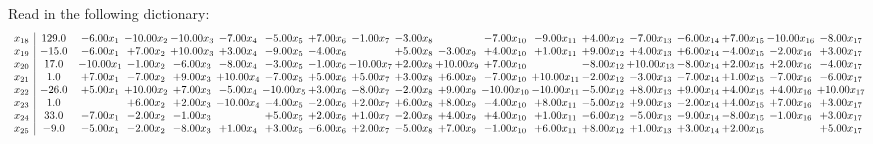\documentclass[9pt]{article}
\begin{document}
Read in the following dictionary:
\[\begin{array}{c| c c@{\hskip 2pt} c@{\hskip 2pt} c@{\hskip 2pt} c@{\hskip 2pt} c@{\hskip 2pt} c@{\hskip 2pt} c@{\hskip 2pt} c@{\hskip 2pt} c@{\hskip 2pt} c@{\hskip 2pt} c@{\hskip 2pt} c@{\hskip 2pt} c@{\hskip 2pt} c@{\hskip 2pt} c@{\hskip 2pt} c@{\hskip 2pt} c@{\hskip 2pt} }
 x_{18}   &  129.0 & -6.00 x_{1} & -10.00 x_{2} & -10.00 x_{3} & -7.00 x_{4} & -5.00 x_{5} & +  7.00 x_{6} & -1.00 x_{7} & -3.00 x_{8} &   & -7.00 x_{10} & -9.00 x_{11} & +  4.00 x_{12} & -7.00 x_{13} & -6.00 x_{14} & +  7.00 x_{15} & -10.00 x_{16} & -8.00 x_{17}\\
 x_{19}   &  -15.0 & -6.00 x_{1} & +  7.00 x_{2} & + 10.00 x_{3} & +  3.00 x_{4} & -9.00 x_{5} & -4.00 x_{6} &   & +  5.00 x_{8} & -3.00 x_{9} & +  4.00 x_{10} & +  1.00 x_{11} & +  9.00 x_{12} & +  4.00 x_{13} & +  6.00 x_{14} & -4.00 x_{15} & -2.00 x_{16} & +  3.00 x_{17}\\
 x_{20}   &  17.0 & -10.00 x_{1} & -1.00 x_{2} & -6.00 x_{3} & -8.00 x_{4} & -3.00 x_{5} & -1.00 x_{6} & -10.00 x_{7} & +  2.00 x_{8} & + 10.00 x_{9} & +  7.00 x_{10} &   & -8.00 x_{12} & + 10.00 x_{13} & -8.00 x_{14} & +  2.00 x_{15} & +  2.00 x_{16} & -4.00 x_{17}\\
 x_{21}   &  1.0 & +  7.00 x_{1} & -7.00 x_{2} & +  9.00 x_{3} & + 10.00 x_{4} & -7.00 x_{5} & +  5.00 x_{6} & +  5.00 x_{7} & +  3.00 x_{8} & +  6.00 x_{9} & -7.00 x_{10} & + 10.00 x_{11} & -2.00 x_{12} & -3.00 x_{13} & -7.00 x_{14} & +  1.00 x_{15} & -7.00 x_{16} & -6.00 x_{17}\\
 x_{22}   &  -26.0 & +  5.00 x_{1} & + 10.00 x_{2} & +  7.00 x_{3} & -5.00 x_{4} & -10.00 x_{5} & +  3.00 x_{6} & -8.00 x_{7} & -2.00 x_{8} & +  9.00 x_{9} & -10.00 x_{10} & -10.00 x_{11} & -5.00 x_{12} & +  8.00 x_{13} & +  9.00 x_{14} & +  4.00 x_{15} & +  4.00 x_{16} & + 10.00 x_{17}\\
 x_{23}   &  1.0  &   & +  6.00 x_{2} & +  2.00 x_{3} & -10.00 x_{4} & -4.00 x_{5} & -2.00 x_{6} & +  2.00 x_{7} & +  6.00 x_{8} & +  8.00 x_{9} & -4.00 x_{10} & +  8.00 x_{11} & -5.00 x_{12} & +  9.00 x_{13} & -2.00 x_{14} & +  4.00 x_{15} & +  7.00 x_{16} & +  3.00 x_{17}\\
 x_{24}   &  33.0 & -7.00 x_{1} & -2.00 x_{2} & -1.00 x_{3} &   & +  5.00 x_{5} & +  2.00 x_{6} & +  1.00 x_{7} & -2.00 x_{8} & +  4.00 x_{9} & +  4.00 x_{10} & +  1.00 x_{11} & -6.00 x_{12} & -5.00 x_{13} & -9.00 x_{14} & -8.00 x_{15} & -1.00 x_{16} & +  3.00 x_{17}\\
 x_{25}   &  -9.0 & -5.00 x_{1} & -2.00 x_{2} & -8.00 x_{3} & +  1.00 x_{4} & +  3.00 x_{5} & -6.00 x_{6} & +  2.00 x_{7} & -5.00 x_{8} & +  7.00 x_{9} & -1.00 x_{10} & +  6.00 x_{11} & +  8.00 x_{12} & +  1.00 x_{13} & +  3.00 x_{14} & +  2.00 x_{15} &   & +  5.00 x_{17}\\

\end{array}\]
\end{document}

